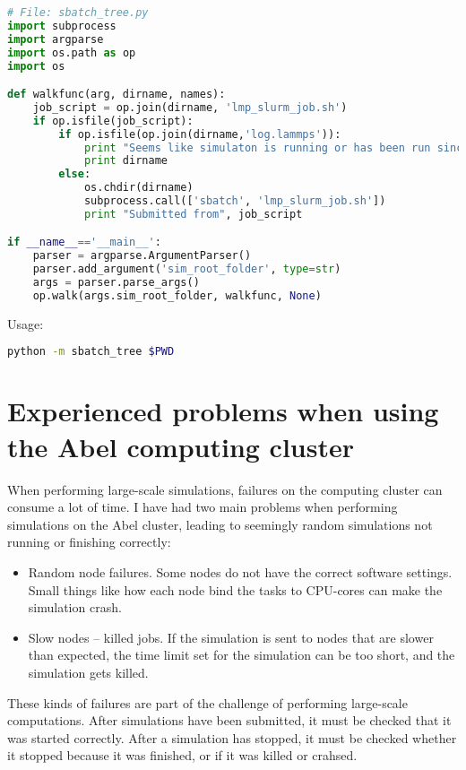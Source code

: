\begin{lstlisting}[language=Python]
# File: sbatch_tree.py
import subprocess
import argparse
import os.path as op
import os

def walkfunc(arg, dirname, names):
	job_script = op.join(dirname, 'lmp_slurm_job.sh')
	if op.isfile(job_script):
		if op.isfile(op.join(dirname,'log.lammps')):
			print "Seems like simulaton is running or has been run since there are output files in the folder"
			print dirname
		else:
			os.chdir(dirname)
			subprocess.call(['sbatch', 'lmp_slurm_job.sh'])
			print "Submitted from", job_script 

if __name__=='__main__':
	parser = argparse.ArgumentParser()
	parser.add_argument('sim_root_folder', type=str)
	args = parser.parse_args()
	op.walk(args.sim_root_folder, walkfunc, None)
\end{lstlisting}

Usage:
\begin{lstlisting}[language=Bash]
python -m sbatch_tree $PWD
\end{lstlisting}

\section{Experienced problems when using the Abel computing cluster}
When performing large-scale simulations, failures on the computing cluster can consume a lot of time. I have had two main problems when performing simulations on the Abel cluster, leading to seemingly random simulations not running or finishing correctly:
\begin{itemize}
\item Random node failures. Some nodes do not have the correct software settings. Small things like how each node bind the tasks to CPU-cores can make the simulation crash.
\item Slow nodes -- killed jobs. If the simulation is sent to nodes that are slower than expected, the time limit set for the simulation can be too short, and the simulation gets killed.
\end{itemize}
These kinds of failures are part of the challenge of performing large-scale computations. After simulations have been submitted, it must be checked that it was started correctly. After a simulation has stopped, it must be checked whether it stopped because it was finished, or if it was killed or crahsed.